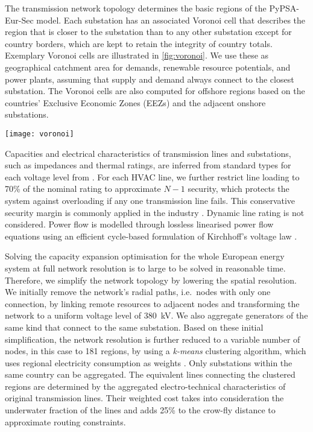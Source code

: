 
The transmission network topology determines the basic regions of the
PyPSA-Eur-Sec model. Each substation has an associated Voronoi cell that
describes the region that is closer to the substation than to any other
substation except for country borders, which are kept to retain the integrity of
country totals. Exemplary Voronoi cells are illustrated in \cref{fig:voronoi}.
We use these as geographical catchment area for demands, renewable resource
potentials, and power plants, assuming that supply and demand always connect to
the closest substation. The Voronoi cells are also computed for offshore regions
based on the countries' Exclusive Economic Zones (EEZs) and the adjacent onshore
substations.

\begin{SCfigure}
    \caption{Exemplary Voronoi cells of the transmission network's substations.}
    \texttt{[image: voronoi]}
    \label{fig:voronoi}
\end{SCfigure}


Capacities and electrical characteristics of transmission lines and substations,
such as impedances and thermal ratings, are
inferred from standard types for each voltage level from \citeS{}. For each HVAC
line, we further restrict line loading to 70\% of the nominal rating to
approximate $N-1$ security, which protects the system against overloading if any
one transmission line fails. This conservative security margin is commonly
applied in the industry \citeS{}. Dynamic line rating is not considered. Power
flow is modelled through lossless linearised power flow equations using an
efficient cycle-based formulation of Kirchhoff's voltage law
.


Solving the capacity expansion optimisation for the whole European energy system
at full network resolution is to large to be solved in reasonable time.
Therefore, we simplify the network topology by lowering the spatial resolution.
We initially remove the network's radial paths, i.e.~nodes with only one
connection, by linking remote resources to adjacent nodes and transforming the
network to a uniform voltage level of \SI{380}{\kilo\volt}. We also aggregate
generators of the same kind that connect to the same substation. Based on these
initial simplification, the network resolution is further reduced to a variable
number of nodes, in this case to 181 regions, by using a \textit{k-means}
clustering algorithm, which uses regional electricity consumption as weights
. Only substations within the
same country can be aggregated. The equivalent lines connecting the clustered
regions are determined by the aggregated electro-technical characteristics of
original transmission lines. Their weighted cost takes into consideration the
underwater fraction of the lines and adds 25\% to the crow-fly distance to
approximate routing constraints.

